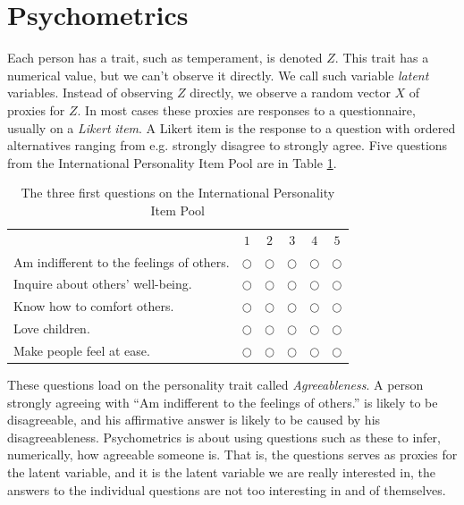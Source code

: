
\section{Psychometrics}

Each person has a trait, such as temperament, is denoted $Z$. This trait has a numerical value, but we can't observe it directly. We call such variable \emph{latent }variables. Instead of observing $Z$ directly, we observe a random vector $X$ of proxies for $Z$. In most cases these proxies are responses to a questionnaire, usually on a \emph{Likert} \emph{item}. A Likert item is the response to a question with ordered alternatives ranging from e.g. strongly disagree to strongly agree. Five questions from the International Personality Item Pool \parencite{Goldberg1992-hp} are in Table \ref{tab:IPIP}.

\begin{table}
\caption{\label{tab:IPIP}The three first questions on the International Personality Item Pool \parencite{Goldberg1992-hp}}
\noindent \begin{centering}
\begin{tabular}{lccccc}
 & $1$ & $2$ & $3$ & $4$ & $5$\tabularnewline
Am indifferent to the feelings of others.  & $\bigcirc$ & $\bigcirc$ & $\bigcirc$ & $\bigcirc$ & $\bigcirc$\tabularnewline
Inquire about others' well-being. & $\bigcirc$ & $\bigcirc$ & $\bigcirc$ & $\bigcirc$ & $\bigcirc$\tabularnewline
Know how to comfort others. & $\bigcirc$ & $\bigcirc$ & $\bigcirc$ & $\bigcirc$ & $\bigcirc$\tabularnewline
Love children. & $\bigcirc$ & $\bigcirc$ & $\bigcirc$ & $\bigcirc$ & $\bigcirc$\tabularnewline
Make people feel at ease.  & $\bigcirc$ & $\bigcirc$ & $\bigcirc$ & $\bigcirc$ & $\bigcirc$\tabularnewline
\end{tabular}
\par\end{centering}
\vskip7.0pt
\noindent {}
\end{table}

These questions load on the personality trait called \emph{Agreeableness}. A person strongly agreeing with ``Am indifferent to the feelings of others.'' is likely to be disagreeable, and his affirmative answer is likely to be caused by his disagreeableness. Psychometrics is about using questions such as these to infer, numerically, how agreeable someone is. That is, the questions serves as proxies for the latent variable, and it is the latent variable we are really interested in, the answers to the individual questions are not too interesting in and of themselves.

